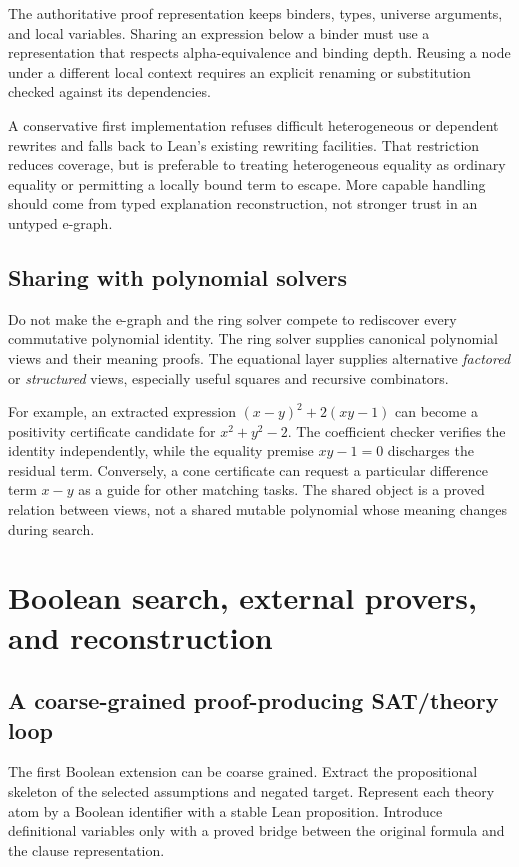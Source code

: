 \documentclass[11pt,a4paper]{article}
\begin{document}
The authoritative proof representation keeps binders, types, universe arguments, and local variables. Sharing an expression below a binder must use a representation that respects alpha-equivalence and binding depth. Reusing a node under a different local context requires an explicit renaming or substitution checked against its dependencies.

A conservative first implementation refuses difficult heterogeneous or dependent rewrites and falls back to Lean's existing rewriting facilities. That restriction reduces coverage, but is preferable to treating heterogeneous equality as ordinary equality or permitting a locally bound term to escape. More capable handling should come from typed explanation reconstruction, not stronger trust in an untyped e-graph.

\subsection{Sharing with polynomial solvers}

Do not make the e-graph and the ring solver compete to rediscover every commutative polynomial identity. The ring solver supplies canonical polynomial views and their meaning proofs. The equational layer supplies alternative \emph{factored} or \emph{structured} views, especially useful squares and recursive combinators.

For example, an extracted expression $(x-y)^2+2(xy-1)$ can become a positivity certificate candidate for $x^2+y^2-2$. The coefficient checker verifies the identity independently, while the equality premise $xy-1=0$ discharges the residual term. Conversely, a cone certificate can request a particular difference term $x-y$ as a guide for other matching tasks. The shared object is a proved relation between views, not a shared mutable polynomial whose meaning changes during search.

\section{Boolean search, external provers, and reconstruction}
\label{sec:boolean}

\subsection{A coarse-grained proof-producing SAT/theory loop}

The first Boolean extension can be coarse grained. Extract the propositional skeleton of the selected assumptions and negated target. Represent each theory atom by a Boolean identifier with a stable Lean proposition. Introduce definitional variables only with a proved bridge between the original formula and the clause representation.
\end{document}
